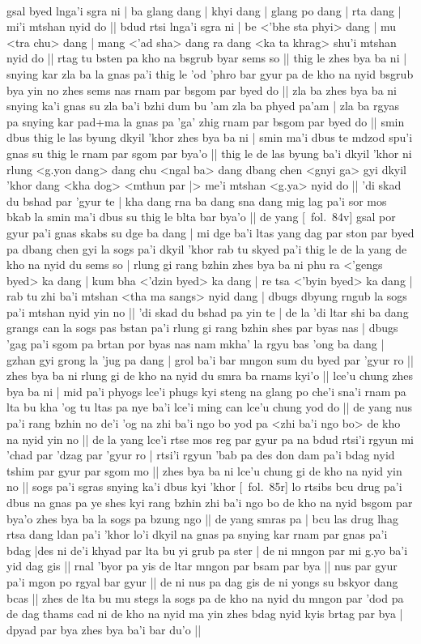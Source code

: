 \documentclass[12pt]{article}
\begin{document}
\textbf{\TVB}\\
gsal byed lnga'i sgra ni | ba glang dang | khyi dang | glang po dang | rta dang | mi'i mtshan nyid do || bdud rtsi lnga'i sgra ni | be <'bhe sta phyi> dang | mu <tra chu> dang | mang <'ad sha> dang ra dang <ka ta khrag> shu'i mtshan nyid do || rtag tu bsten pa kho na bsgrub byar sems so || thig le zhes bya ba ni | snying kar zla ba la gnas pa'i thig le 'od 'phro bar gyur pa de kho na nyid bsgrub bya yin no zhes sems nas rnam par bsgom par byed do || zla ba zhes bya ba ni snying ka'i gnas su zla ba'i bzhi dum bu 'am zla ba phyed pa'am | zla ba rgyas pa snying kar pad+ma la gnas pa 'ga' zhig rnam par bsgom par byed do || smin dbus thig le las byung dkyil 'khor zhes bya ba ni | smin ma'i dbus te mdzod spu'i gnas su thig le rnam par sgom par bya'o || thig le de las byung ba'i dkyil 'khor ni rlung <g.yon dang> dang chu <ngal ba> dang dbang chen <gnyi ga> gyi dkyil 'khor dang <kha dog> <mthun par |> me'i mtshan <g.ya> nyid do || 'di skad du bshad par 'gyur te | kha dang rna ba dang sna dang mig lag pa'i sor mos bkab la smin ma'i dbus su thig le blta bar bya'o || de yang [\TVB\ fol.\ 84v] gsal por gyur pa'i gnas skabs su dge ba dang | mi dge ba'i ltas yang dag par ston par byed pa dbang chen gyi la sogs pa'i dkyil 'khor rab tu skyed pa'i thig le de la yang de kho na nyid du sems so | rlung gi rang bzhin zhes bya ba ni phu ra <'gengs byed> ka dang | kum bha <'dzin byed> ka dang | re tsa <'byin byed> ka dang | rab tu zhi ba'i mtshan <tha ma sangs> nyid dang | dbugs dbyung rngub la sogs pa'i mtshan nyid yin no || 'di skad du bshad pa yin te | de la 'di ltar shi ba dang grangs can la sogs pas bstan pa'i rlung gi rang bzhin shes par byas nas | dbugs 'gag pa'i sgom pa brtan por byas nas nam mkha' la rgyu bas 'ong ba dang | gzhan gyi grong la 'jug pa dang | grol ba'i bar mngon sum du byed par 'gyur ro || zhes bya ba ni rlung gi de kho na nyid du smra ba rnams kyi'o || lce'u chung zhes bya ba ni | mid pa'i phyogs lce'i phugs kyi steng na glang po che'i sna'i rnam pa lta bu kha 'og tu ltas pa nye ba'i lce'i ming can lce'u chung yod do || de yang nus pa'i rang bzhin no de'i 'og na zhi ba'i ngo bo yod pa <zhi ba'i ngo bo> de kho na nyid yin no || de la yang lce'i rtse mos reg par gyur pa na bdud rtsi'i rgyun mi 'chad par 'dzag par 'gyur ro | rtsi'i rgyun 'bab pa des don dam pa'i bdag nyid tshim par gyur par sgom mo || zhes bya ba ni lce'u chung gi de kho na nyid yin no || sogs pa'i sgras snying ka'i dbus kyi 'khor [\TVB\ fol.\ 85r] lo rtsibs bcu drug pa'i dbus na gnas pa ye shes kyi rang bzhin zhi ba'i ngo bo de kho na nyid bsgom par bya'o zhes bya ba la sogs pa bzung ngo  || de yang smras pa | bcu las drug lhag rtsa dang ldan pa'i 'khor lo'i dkyil na gnas pa snying kar rnam par gnas pa'i bdag  |des ni de'i khyad par lta bu yi grub pa ster | de ni mngon par mi g.yo ba'i yid dag gis || rnal 'byor pa yis de ltar mngon par bsam par bya || nus par gyur pa'i mgon po rgyal bar gyur || de ni nus pa dag gis de ni yongs su bskyor dang bcas || zhes de lta bu mu stegs la sogs pa de kho na nyid du mngon par 'dod pa de dag thams cad ni de kho na nyid ma yin zhes bdag nyid kyis brtag par bya | dpyad par bya zhes bya ba'i bar du'o || 
\end{document}
